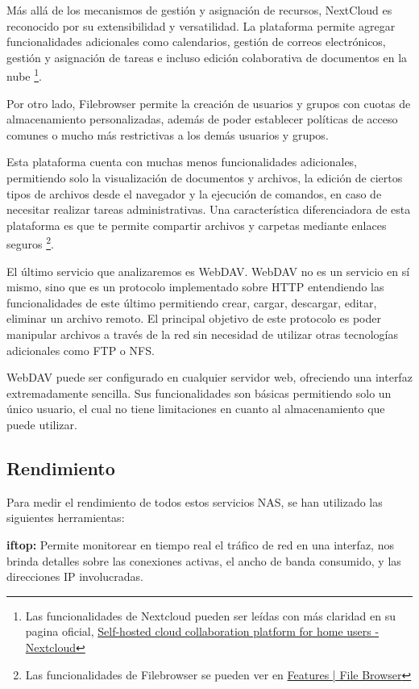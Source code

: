 \documentclass[a4paper,10pt]{article}
\begin{document}
	Más allá de los mecanismos de gestión y asignación de recursos, NextCloud es reconocido por su extensibilidad y versatilidad. La plataforma permite agregar funcionalidades adicionales como calendarios, gestión de correos electrónicos, gestión y asignación de tareas e incluso edición colaborativa de documentos en la nube \footnote{Las funcionalidades de Nextcloud pueden ser leídas con más claridad en su pagina oficial, \href{https://nextcloud.com/es/athome/}{Self-hosted cloud collaboration platform for home users - Nextcloud}}.
	
	Por otro lado, Filebrowser permite la creación de usuarios y grupos con cuotas de almacenamiento personalizadas, además de poder establecer políticas de acceso comunes o mucho más restrictivas a los demás usuarios y grupos.
	
	Esta plataforma cuenta con muchas menos funcionalidades adicionales, permitiendo solo la visualización de documentos y archivos, la edición de ciertos tipos de archivos desde el navegador y la ejecución de comandos, en caso de necesitar realizar tareas administrativas. Una característica diferenciadora de esta plataforma es que te permite compartir archivos y carpetas mediante enlaces seguros \footnote{Las funcionalidades de Filebrowser se pueden ver en \href{https://filebrowser.org/features}{Features | File Browser}}.
	
	El último servicio que analizaremos es WebDAV. WebDAV no es un servicio en sí mismo, sino que es un protocolo implementado sobre HTTP entendiendo las funcionalidades de este último permitiendo crear, cargar, descargar, editar, eliminar un archivo remoto. El principal objetivo de este protocolo es poder manipular archivos a través de la red sin necesidad de utilizar otras tecnologías adicionales como FTP o NFS.
	
	WebDAV puede ser configurado en cualquier servidor web, ofreciendo una interfaz extremadamente sencilla. Sus funcionalidades son básicas permitiendo solo un único usuario, el cual no tiene limitaciones en cuanto al almacenamiento que puede utilizar.
	
	\subsection{Rendimiento}
	Para medir el rendimiento de todos estos servicios NAS, se han utilizado las siguientes herramientas:
	
	\textbf{iftop:} Permite monitorear en tiempo real el tráfico de red en una interfaz, nos brinda detalles sobre las conexiones activas, el ancho de banda consumido, y las direcciones IP involucradas.
	
\end{document}
